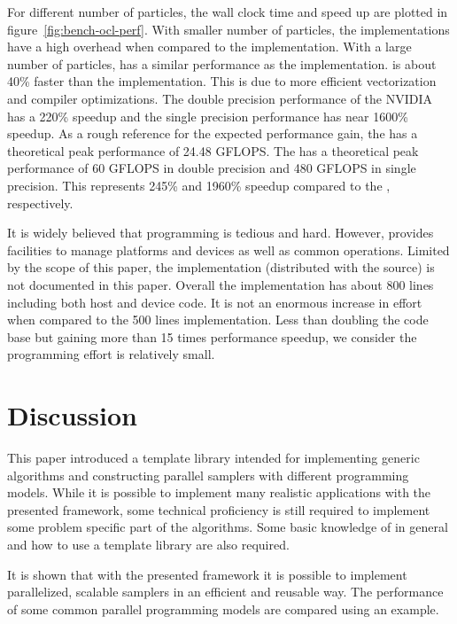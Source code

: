 \documentclass[11pt, bib, hyper, mint, minted=cache]{marticle}
\begin{document}
For different number of particles, the wall clock time and speed up are
plotted in figure~\ref{fig:bench-ocl-perf}. With smaller number of particles,
the \lopencl implementations have a high overhead when compared to the \ltbb
implementation. With a large number of particles, \laocl has a similar
performance as the \ltbb implementation. \liocl is about 40\% faster than the
\ltbb implementation. This is due to more efficient vectorization and compiler
optimizations. The double precision performance of the NVIDIA \gpu has a 220\%
speedup and the single precision performance has near 1600\% speedup. As a
rough reference for the expected performance gain, the \cpu has a theoretical
peak performance of 24.48 GFLOPS. The \gpu has a theoretical peak performance
of 60 GFLOPS in double precision and 480 GFLOPS in single precision. This
represents 245\% and 1960\% speedup compared to the \cpu, respectively.

It is widely believed that \lopencl programming is tedious and hard. However,
\vsmc provides facilities to manage \lopencl platforms and devices as well as
common operations. Limited by the scope of this paper, the \lopencl
implementation (distributed with the \vsmc source) is not documented in this
paper. Overall the \lopencl implementation has about 800 lines including both
host and device code. It is not an enormous increase in effort when compared
to the 500 lines \smp implementation. Less than doubling the code base but
gaining more than 15 times performance speedup, we consider the programming
effort is relatively small.

\section{Discussion}
\label{sec:Discussion}

This paper introduced a \cpp template library intended for implementing
generic \smc algorithms and constructing parallel samplers with different
programming models. While it is possible to implement many realistic
applications with the presented framework, some technical proficiency is still
required to implement some problem specific part of the algorithms. Some basic
knowledge of \cpp in general and how to use a template library are also
required.

It is shown that with the presented framework it is possible to implement
parallelized, scalable \smc samplers in an efficient and reusable way. The
performance of some common parallel programming models are compared using an
example.
\end{document}
